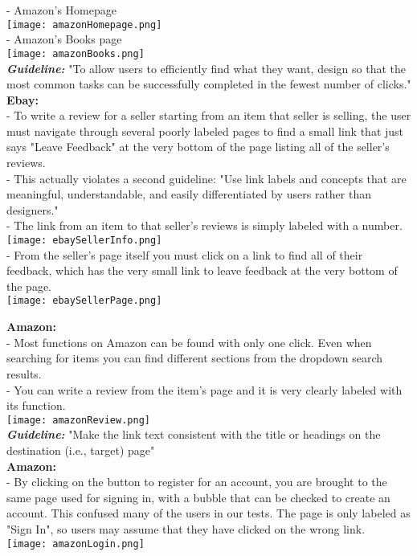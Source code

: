 \documentclass{article}
\begin{document}
  - Amazon's Homepage\\
\texttt{[image: amazonHomepage.png]}\\ 
  - Amazon's Books page\\
\texttt{[image: amazonBooks.png]}\\
 
\textbf{\emph{Guideline:}} "To allow users to efficiently find what they want, design so that the most common tasks can be successfully completed in the fewest number of clicks."\\
\textbf{Ebay:}\\
  - To write a review for a seller starting from an item that seller is selling, the user must navigate through several poorly labeled pages to find a small link that just says "Leave Feedback" at the very bottom of the page listing all of the seller's reviews.\\ 
  - This actually violates a second guideline: "Use link labels and concepts that are meaningful, understandable, and easily differentiated by users rather than designers."\\
  - The link from an item to that seller's reviews is simply labeled with a number.\\
\texttt{[image: ebaySellerInfo.png]}\\

  - From the seller's page itself you must click on a link to find all of their feedback, which has the very small link to leave feedback at the very bottom of the page.\\
\texttt{[image: ebaySellerPage.png]}

\textbf{Amazon:}\\
  - Most functions on Amazon can be found with only one click. Even when searching for items you can find different sections from the dropdown search results.\\
  - You can write a review from the item's page and it is very clearly labeled with its function.\\
\texttt{[image: amazonReview.png]}\\

\textbf{\emph{Guideline:}} "Make the link text consistent with the title or headings on the destination (i.e., target) page"\\
\textbf{Amazon:}\\
  - By clicking on the button to register for an account, you are brought to the same page used for signing in, with a bubble that can be checked to create an account. This confused many of the users in our tests. The page is only labeled as "Sign In", so users may assume that they have clicked on the wrong link.\\
\texttt{[image: amazonLogin.png]}\\
\end{document}
